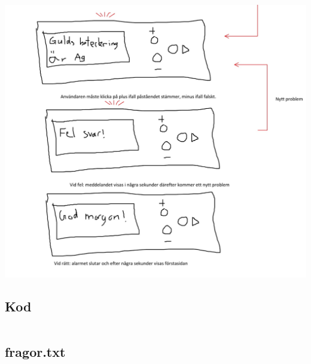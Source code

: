 \documentclass[12pt, a4paper,titlepage]{article}
\begin{document}
            \newpage
            \includegraphics[scale=0.35]{Pseudokod-3.jpg}
            \newpage
            
        \subsection{Kod}
        \label{sec:kod}
            \tiny{\inputminted{python}{lcd.py}}
            \newpage
        \subsection{fragor.txt}
        \label{sec:fragor}
            \normalsize{}
            \newpage
\end{document}
